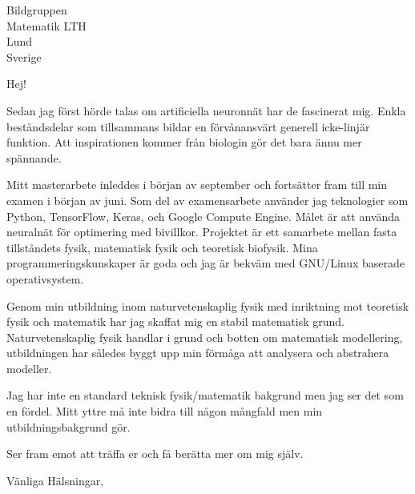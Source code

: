 \documentclass[10pt]{letter}
\begin{document}
\begin{letter}{Bildgruppen \\ Matematik LTH \\ Lund\\ Sverige}
  \opening{Hej!}

  Sedan jag först hörde talas om artificiella neuronnät har de
  fascinerat mig. Enkla beståndsdelar som tillsammans bildar en
  förvånansvärt generell icke-linjär funktion. Att inspirationen
  kommer från biologin gör det bara ännu mer spännande.

  Mitt masterarbete inleddes i början av september och fortsätter fram
  till min examen i början av juni. Som del av examensarbete använder
  jag teknologier som Python, TensorFlow, Keras, och Google Compute
  Engine. Målet är att använda neuralnät för optimering med
  bivillkor. Projektet är ett samarbete mellan fasta tillståndets
  fysik, matematisk fysik och teoretisk biofysik. Mina
  programmeringskunskaper är goda och jag är bekväm med GNU/Linux
  baserade operativsystem.

  Genom min utbildning inom naturvetenskaplig fysik med inriktning mot
  teoretisk fysik och matematik har jag skaffat mig en stabil
  matematisk grund. Naturvetenskaplig fysik handlar i grund och botten
  om matematisk modellering, utbildningen har således byggt upp min
  förmåga att analysera och abstrahera modeller.

  Jag har inte en standard teknisk fysik/matematik bakgrund men jag ser
  det som en fördel. Mitt yttre må inte bidra till någon mångfald men
  min utbildningsbakgrund gör.

  Ser fram emot att träffa er och få berätta mer om mig själv.

  \closing{Vänliga Hälsningar,}
\end{letter}
\end{document}
